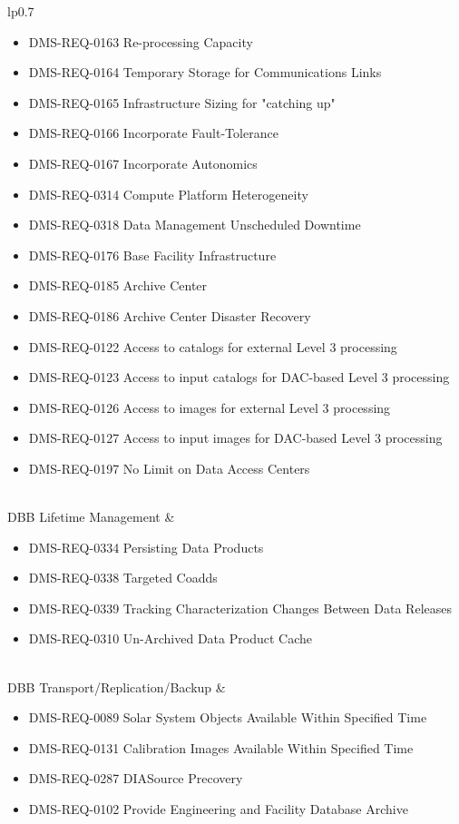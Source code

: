 \begin{xtabular}{lp{0.7\textwidth}}
\begin{itemize}
\item DMS-REQ-0163 Re-processing Capacity
\item DMS-REQ-0164 Temporary Storage for Communications Links
\item DMS-REQ-0165 Infrastructure Sizing for "catching up"
\item DMS-REQ-0166 Incorporate Fault-Tolerance
\item DMS-REQ-0167 Incorporate Autonomics
\item DMS-REQ-0314 Compute Platform Heterogeneity
\item DMS-REQ-0318 Data Management Unscheduled Downtime
\item DMS-REQ-0176 Base Facility Infrastructure
\item DMS-REQ-0185 Archive Center
\item DMS-REQ-0186 Archive Center Disaster Recovery
\item DMS-REQ-0122 Access to catalogs for external Level 3 processing
\item DMS-REQ-0123 Access to input catalogs for DAC-based Level 3 processing
\item DMS-REQ-0126 Access to images for external Level 3 processing
\item DMS-REQ-0127 Access to input images for DAC-based Level 3 processing
\item DMS-REQ-0197 No Limit on Data Access Centers
\end{itemize} \\ \hline
DBB Lifetime Management &
\begin{itemize}DMS-REQ-0346 Data Availability
\item DMS-REQ-0334 Persisting Data Products
\item DMS-REQ-0338 Targeted Coadds
\item DMS-REQ-0339 Tracking Characterization Changes Between Data Releases
\item DMS-REQ-0310 Un-Archived Data Product Cache
\end{itemize} \\ \hline
DBB Transport/Replication/Backup &
\begin{itemize}DMS-REQ-0344 Constraints on Level 1 Special Program Products Generation
\item DMS-REQ-0089 Solar System Objects Available Within Specified Time
\item DMS-REQ-0131 Calibration Images Available Within Specified Time
\item DMS-REQ-0287 DIASource Precovery
\item DMS-REQ-0102 Provide Engineering and Facility Database Archive

\end{itemize}
\end{xtabular}
